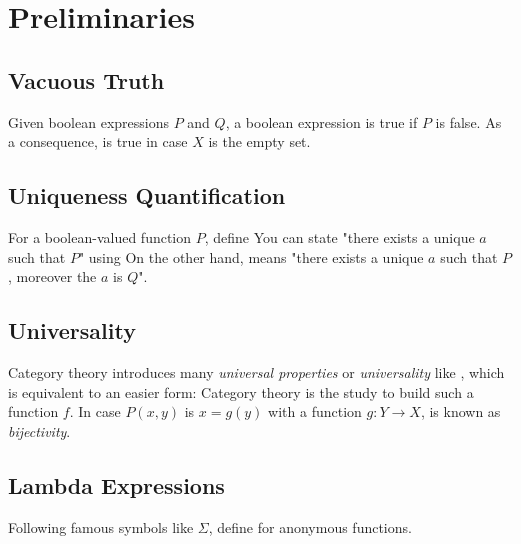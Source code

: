 \section{Preliminaries}

\subsection{Vacuous Truth}

Given boolean expressions $P$ and $Q$, a boolean expression
is true if $P$ is false.
As a consequence,
is true in case $X$ is the empty set.

\subsection{Uniqueness Quantification}

For a boolean-valued function $P$, define
You can state "there exists a unique $a$ such that $P$" using
On the other hand,
means "there exists a unique $a$ such that $P$, moreover the $a$ is $Q$".

\subsection{Universality}

Category theory introduces many \emph{universal properties} or \emph{universality} like 
, which is equivalent to an easier form:
Category theory is the study to build such a function $f$.
\mynewline
In case $P(x,y)$ is $x = g(y)$ with a function $g : Y \to X$,
is known as \emph{bijectivity}.

\subsection{Lambda Expressions}

Following famous symbols like $\Sigma$, define
for anonymous functions.


